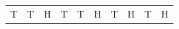 {\begin{center}
\begin{xtabular*}{\mytablewidth}[t]{|p{10\mystarwidth}|p{10\mystarwidth}|p{10\mystarwidth}|p{10\mystarwidth}|p{10\mystarwidth}|p{10\mystarwidth}|p{10\mystarwidth}|p{10\mystarwidth}|p{10\mystarwidth}|p{10\mystarwidth}|}
    
        T &
    
    
        T &
    
    
        H &
    
    
        T &
    
    
        T &
    
    
        H &
    
    
        T &
    
    
        H &
    
    
        T &
    
    
        H%
     \tabularnewline{}
    

\end{xtabular*}
\end{center}}
